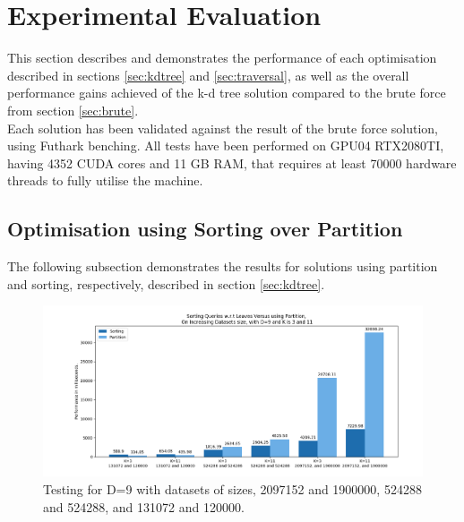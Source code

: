 \section{Experimental Evaluation}
\label{sec:eval}




This section describes and demonstrates the performance of each optimisation described in sections \ref{sec:kdtree} and \ref{sec:traversal}, as well as the overall performance gains achieved of the k-d tree solution compared to the brute force from section \ref{sec:brute}.
\\[2mm]
Each solution has been validated against the result of the brute force solution, using Futhark benching. All tests have been performed on GPU04 RTX2080TI, having 4352 CUDA cores and 11 GB RAM, that requires at least 70000 hardware threads to fully utilise the machine.


\subsection{Optimisation using Sorting over Partition}
\label{sec:sorpar}

The following subsection demonstrates the results for solutions using partition and sorting, respectively, described in section \ref{sec:kdtree}. 


\begin{figure}[H]
\centering
\includegraphics[width=1\textwidth]{pics/plot-figs/new-sort-all-d9.png}
\caption{Testing for D=9 with datasets of sizes‚ 2097152 and 1900000, 524288 and 524288, and 131072 and 120000.}
\label{fig:sort1}
\end{figure}

